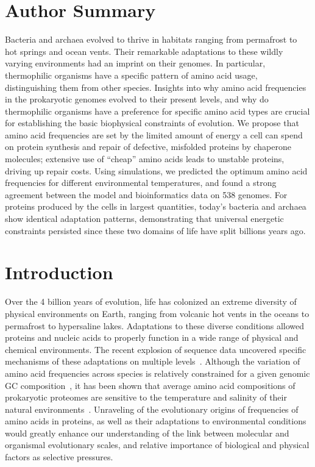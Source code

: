 \documentclass[10pt,letterpaper]{article}
\begin{document}
\section*{Author Summary}

Bacteria and archaea evolved to thrive in habitats ranging from permafrost to hot springs and ocean vents. Their remarkable adaptations to these wildly varying environments had an imprint on their genomes. In particular, thermophilic organisms have a specific pattern of amino acid usage, distinguishing them from other species. Insights into why amino acid frequencies in the prokaryotic genomes evolved to their present levels, and why do thermophilic organisms have a preference for specific amino acid types are crucial for establishing the basic biophysical constraints of evolution. We propose that amino acid frequencies are set by the limited amount of energy a cell can spend on protein synthesis and repair of defective, misfolded proteins by chaperone molecules; extensive use of “cheap” amino acids leads to unstable proteins, driving up repair costs. Using simulations, we predicted the optimum amino acid frequencies for different environmental temperatures, and found a strong agreement between the model and bioinformatics data on 538 genomes. For proteins produced by the cells in largest quantities, today’s bacteria and archaea show identical adaptation patterns, demonstrating that universal energetic constraints persisted since these two domains of life have split billions years ago.


\section*{Introduction}

Over the 4 billion years of evolution, life has colonized an extreme diversity of physical environments on Earth, ranging from volcanic hot vents in the oceans to permafrost to hypersaline lakes. Adaptations to these diverse conditions allowed proteins and nucleic acids to properly function in a wide range of physical and chemical environments. The recent explosion
of sequence data uncovered specific mechanisms of these adaptations on multiple levels~\cite{Berezovsky2007Positive,Galtier1997Relationships,Zeldovich2007Protein,England2003Natural,Sghaier2013There,Fukuchi2003Unique}. Although the variation of amino acid frequencies across species is relatively constrained for a given genomic GC composition~\cite{Krick2014Amino,Goncearenco2014Fundamental}, it has been shown that average amino acid compositions of prokaryotic proteomes are sensitive to the temperature and salinity of their natural environments~\cite{Fukuchi2003Unique,Kreil2001Identification}. Unraveling of the evolutionary origins of frequencies of amino acids in proteins, as well as their adaptations to environmental conditions would greatly enhance our understanding of the link between molecular and organismal evolutionary scales, and relative importance of biological and physical factors as selective pressures.
\end{document}
